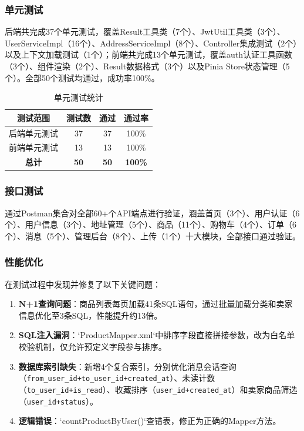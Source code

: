 \documentclass[12pt,a4paper,oneside]{ctexart}
\begin{document}
\subsubsection{单元测试}

后端共完成37个单元测试，覆盖Result工具类（7个）、JwtUtil工具类（3个）、UserServiceImpl（16个）、AddressServiceImpl（8个）、Controller集成测试（2个）以及上下文加载测试（1个）；前端共完成13个单元测试，覆盖auth认证工具函数（3个）、组件渲染（2个）、Result数据格式（3个）以及Pinia Store状态管理（5个）。全部50个测试均通过，成功率100\%。

\begin{table}[H]
\centering
\caption{单元测试统计}
\label{tab:unittest}
\begin{tabular}{|c|c|c|c|}
\hline
\textbf{测试范围} & \textbf{测试数} & \textbf{通过} & \textbf{通过率} \\
\hline
后端单元测试 & 37 & 37 & 100\% \\
\hline
前端单元测试 & 13 & 13 & 100\% \\
\hline
\textbf{总计} & \textbf{50} & \textbf{50} & \textbf{100\%} \\
\hline
\end{tabular}
\end{table}

\subsubsection{接口测试}

通过Postman集合对全部60+个API端点进行验证，涵盖首页（3个）、用户认证（6个）、用户信息（3个）、地址管理（5个）、商品（11个）、购物车（4个）、订单（6个）、消息（5个）、管理后台（8个）、上传（1个）十大模块，全部接口通过验证。

\subsubsection{性能优化}

在测试过程中发现并修复了以下关键问题：

\begin{enumerate}[nosep]
    \item \textbf{N+1查询问题}：商品列表每页加载41条SQL语句，通过批量加载分类和卖家信息优化至3条SQL，性能提升约13倍。
    \item \textbf{SQL注入漏洞}：`ProductMapper.xml`中排序字段直接拼接参数，改为白名单校验机制，仅允许预定义字段参与排序。
    \item \textbf{数据库索引缺失}：新增4个复合索引，分别优化消息会话查询（\texttt{from\_user\_id+to\_user\_id+created\_at}）、未读计数（\texttt{to\_user\_id+is\_read}）、收藏排序（\texttt{user\_id+created\_at}）和卖家商品筛选（\texttt{user\_id+status}）。
    \item \textbf{逻辑错误}：`countProductByUser()`查错表，修正为正确的Mapper方法。
\end{enumerate}
\end{document}
